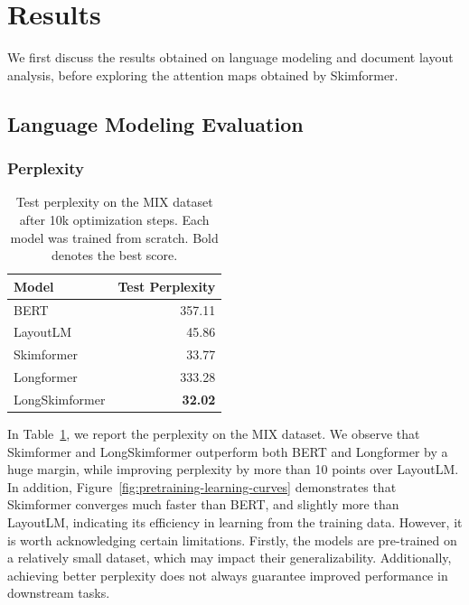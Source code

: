 \section{Results}

We first discuss the results obtained on language modeling and document layout analysis, before exploring the attention maps obtained by Skimformer.

\subsection{Language Modeling Evaluation}

\subsubsection{Perplexity}

\begin{table}
\centering \small
\begin{tabular}{lr}
    \hline
    \textbf{Model} & \textbf{Test Perplexity}\\
    \hline
    \ac{BERT} \citep{devlin2018bert} &  357.11 \\
    LayoutLM \citep{xu2020layoutlm}    & 45.86 \\
    Skimformer                         & 33.77 \\
    \midrule
    Longformer \citep{beltagy2020longformer} & 333.28 \\
    LongSkimformer                     & \textbf{32.02} \\
    \hline
\end{tabular}
\caption{Test perplexity on the MIX dataset after 10k optimization steps. Each model was trained from scratch. Bold denotes the best score.}
\label{tab:ppl-mix}
\end{table}

In Table~\ref{tab:ppl-mix}, we report the perplexity on the MIX dataset. We observe that Skimformer and LongSkimformer outperform both \ac{BERT} and Longformer by a huge margin, while improving perplexity by more than 10 points over LayoutLM. In addition, Figure~\ref{fig:pretraining-learning-curves} demonstrates that Skimformer converges much faster than \ac{BERT}, and slightly more than LayoutLM, indicating its efficiency in learning from the training data. However, it is worth acknowledging certain limitations. Firstly, the models are pre-trained on a relatively small dataset, which may impact their generalizability. Additionally, achieving better perplexity does not always guarantee improved performance in downstream tasks.

